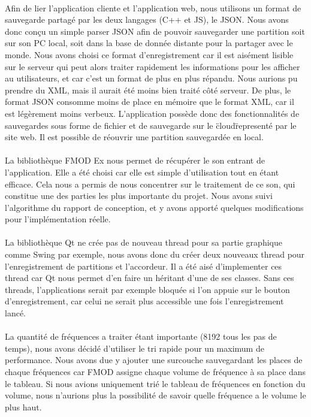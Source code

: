 \paragraph{}
Afin de lier l'application cliente et l'application web, nous utilisons un format de sauvegarde partagé par les deux 
langages (C++ et JS), le JSON. Nous avons donc conçu un simple parser JSON afin de pouvoir sauvegarder une partition 
soit sur son PC local, soit dans la base de donnée distante pour la partager avec le monde. Nous avons choisi 
ce format d'enregistrement car il est aisément lisible sur le serveur qui peut alors traiter rapidement les informations 
pour les afficher au utilisateurs, et car c'est un format de plus en plus répandu. Nous aurions pu prendre du XML, mais 
il aurait été moins bien traité côté serveur. De plus, le format JSON consomme moins de place en mémoire que le format XML,
car il est légèrement moins verbeux. L'application possède donc des fonctionnalités de sauvegardes sous forme de fichier et 
de sauvegarde sur le \"cloud\" representé par le site web. Il est possible de réouvrir une partition sauvegardée en local.

\paragraph{}
La bibliothèque FMOD Ex nous permet de récupérer le son entrant de l'application. Elle a été choisi car elle est simple 
d'utilisation tout en étant efficace. Cela nous a permis de nous concentrer sur le traitement de ce son, qui constitue 
une des parties les plus importante du projet. Nous avons suivi l'algorithme du rapport de conception, et y avons apporté 
quelques modifications pour l'implémentation réelle.

\paragraph{}
La bibliothèque Qt ne crée pas de nouveau thread pour sa partie graphique comme Swing par exemple, nous avons donc du créer deux nouveaux 
thread pour l'enregistrement de partitions et l'accordeur. Il a été aisé d'implementer ces thread car Qt nous permet d'en 
faire un héritant d'une de ses classes. Sans ces threads, l'applications serait par exemple bloquée si l'on appuie sur le 
bouton d'enregistrement, car celui ne serait plus accessible une fois l'enregistrement lancé.

\paragraph{}
La quantité de fréquences a traiter étant importante (8192 tous les pas de temps), nous avons décidé d'utiliser 
le tri rapide pour un maximum de performance. Nous avons due y ajouter une surcouche sauvegardant les places de chaque fréquences 
car FMOD assigne chaque volume de fréquence à sa place dans le tableau. Si nous avions uniquement trié le tableau de fréquences 
en fonction du volume, nous n'aurions plus la possibilité de savoir quelle fréquence a le volume le plus haut. 

